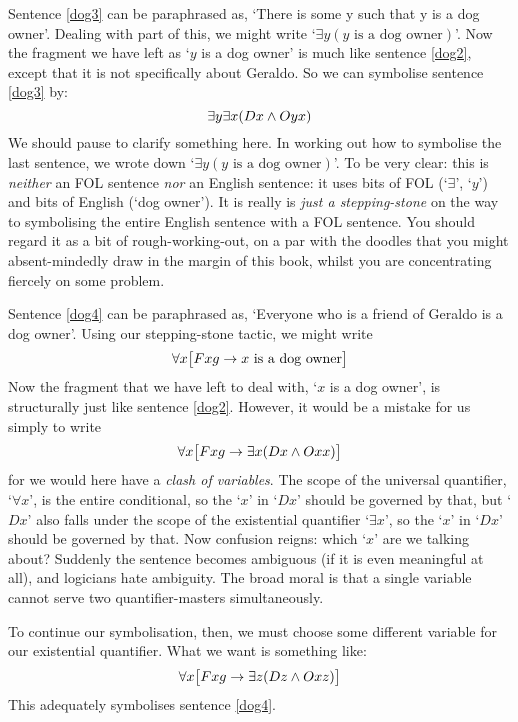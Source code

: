 Sentence \ref{dog3} can be paraphrased as, `There is some y such that y is a dog owner'. Dealing with part of this, we might write `$\exists y(y\text{ is a dog owner})$'. Now the fragment we have left as `$y$ is a dog owner' is much like sentence \ref{dog2}, except that it is not specifically about Geraldo. So we can symbolise sentence \ref{dog3} by:
$$\exists y \exists x(Dx \wedge Oyx)$$
We should pause to clarify something here. In working out how to symbolise the last sentence, we wrote down `$\exists y(y\text{ is a dog owner})$'. To be very clear: this is \emph{neither} an FOL sentence \emph{nor} an English sentence: it uses bits of FOL (`$\exists$', `$y$') and bits of English (`dog owner'). It is really is \emph{just a stepping-stone} on the way to symbolising the entire English sentence with a FOL sentence. You should regard it as a bit of rough-working-out, on a par with the doodles that you might absent-mindedly draw in the margin of this book, whilst you are concentrating fiercely on some problem.  

Sentence \ref{dog4} can be paraphrased as, `Everyone who is a friend of Geraldo is a dog owner'. Using our stepping-stone tactic, we might write 
$$\forall x \bigl[Fxg \rightarrow x \text{ is a dog owner}\bigr]$$
Now the fragment that we have left to deal with, `$x$ is a dog owner', is structurally just like sentence \ref{dog2}. However, it would be a mistake for us simply to write 
$$\forall x \bigl[Fxg \rightarrow \exists x(Dx \wedge Oxx)\bigr]$$
for we would here have a \emph{clash of variables}. The scope of the universal quantifier, `$\forall x$', is the entire conditional, so the `$x$' in `$Dx$' should be governed by that, but `$Dx$' also falls under the scope of the existential quantifier `$\exists x$', so the `$x$' in `$Dx$' should be governed by that. Now confusion reigns: which `$x$' are we talking about? Suddenly the sentence becomes ambiguous (if it is even meaningful at all), and logicians hate ambiguity. The broad moral is that a single variable cannot serve two quantifier-masters simultaneously. 

To continue our symbolisation, then, we must choose some different variable for our existential quantifier. What we want is something like:
$$\forall x\bigl[Fxg \rightarrow\exists z(Dz \wedge Oxz)\bigr]$$
This adequately symbolises sentence \ref{dog4}.

